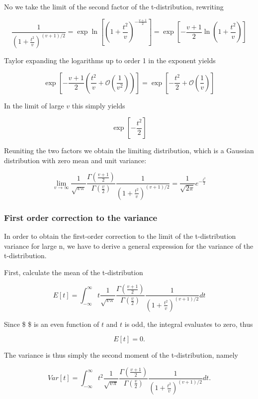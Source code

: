 \documentclass[11pt]{article}
\begin{document}
No we take the limit of the second factor of the t-distribution,
rewriting

\[\frac{1}{\left( 1+ \frac{t^{2}}{v} \right)^{(v+1)/2}}= \exp{ \ln {\left[ \left( 1+\frac{t^2}{v} \right) ^{-\frac{v+1}{2}} \right]}}= \exp{ \left[-\frac{v+1}{2} \ln { \left( 1+\frac{t^2}{v} \right) } \right]} \]

Taylor expanding the logarithms up to order 1 in the exponent yields

\[ \exp{ \left[ -\frac{v+1}{2} \left( \frac{t^2}{v} + \mathcal{O}(\frac{1}{v^2}) \right) \right]}=\exp{ \left[ -\frac{t^2}{2} + \mathcal{O}(\frac{1}{v}) \right]}\]

In the limit of large \(v\) this simply yields

\[ \exp \left[ -\frac{t^2}{2} \right] \]

Reuniting the two factors we obtain the limiting distribution, which is
a Gaussian distribution with zero mean and unit variance:

\[\lim_{v \rightarrow \infty} \frac{1}{\sqrt{v  \pi}} \frac{\Gamma{\left( \frac{v+1}{2} \right)}}{\Gamma{\left( \frac{v}{2} \right)}} \frac{1}{\left( 1+ \frac{t^{2}}{v} \right)^{(v+1)/2}} = \frac{1}{\sqrt{2 \pi}} e^{ -\frac{t^2}{2}}\]

\subsubsection{First order correction to the
variance}\label{first-order-correction-to-the-variance}

In order to obtain the first-order correction to the limit of the
t-distribution variance for large n, we have to derive a general
expression for the variance of the t-distribution.

First, calculate the mean of the t-distribution

\[E[t]= \int_{-\infty}^{\infty} t \frac{1}{\sqrt{v  \pi}} \frac{\Gamma{\left( \frac{v+1}{2} \right)}}{\Gamma{\left( \frac{v}{2} \right)}} \frac{1}{\left( 1+ \frac{t^{2}}{v} \right)^{(v+1)/2}} dt\]

Since \$ \$ is an
even function of \(t\) and \(t\) is odd, the integral evaluates to zero,
thus

\[ E[t]=0.\]

The variance is thus simply the second moment of the t-distribution,
namely

\[ Var[t]= \int_{-\infty}^{\infty} t^2 \frac{1}{\sqrt{v  \pi}} \frac{\Gamma{\left( \frac{v+1}{2} \right)}}{\Gamma{\left( \frac{v}{2} \right)}} \frac{1}{\left( 1+ \frac{t^{2}}{v} \right)^{(v+1)/2}} dt.\]
\end{document}

